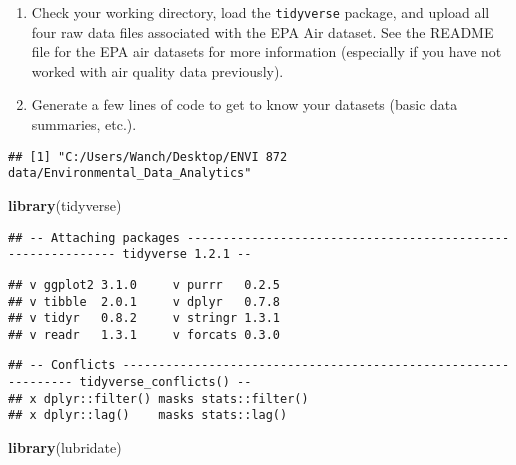 \documentclass[]{article}
\newenvironment{Shaded}{\begin{snugshade}}{\end{snugshade}}
\newcommand{\KeywordTok}[1]{\textcolor[rgb]{0.13,0.29,0.53}{\textbf{#1}}}
\newcommand{\CommentTok}[1]{\textcolor[rgb]{0.56,0.35,0.01}{\textit{#1}}}
\newcommand{\NormalTok}[1]{#1}
\begin{document}
\begin{enumerate}
\def\labelenumi{\arabic{enumi}.}
\item
  Check your working directory, load the \texttt{tidyverse} package, and
  upload all four raw data files associated with the EPA Air dataset.
  See the README file for the EPA air datasets for more information
  (especially if you have not worked with air quality data previously).
\item
  Generate a few lines of code to get to know your datasets (basic data
  summaries, etc.).
\end{enumerate}

\begin{Shaded}
\end{Shaded}

\begin{verbatim}
## [1] "C:/Users/Wanch/Desktop/ENVI 872 data/Environmental_Data_Analytics"
\end{verbatim}

\begin{Shaded}
\begin{Highlighting}[]
\KeywordTok{library}\NormalTok{(tidyverse)}
\end{Highlighting}
\end{Shaded}

\begin{verbatim}
## -- Attaching packages ------------------------------------------------------------ tidyverse 1.2.1 --
\end{verbatim}

\begin{verbatim}
## v ggplot2 3.1.0     v purrr   0.2.5
## v tibble  2.0.1     v dplyr   0.7.8
## v tidyr   0.8.2     v stringr 1.3.1
## v readr   1.3.1     v forcats 0.3.0
\end{verbatim}

\begin{verbatim}
## -- Conflicts --------------------------------------------------------------- tidyverse_conflicts() --
## x dplyr::filter() masks stats::filter()
## x dplyr::lag()    masks stats::lag()
\end{verbatim}

\begin{Shaded}
\begin{Highlighting}[]
\KeywordTok{library}\NormalTok{(lubridate)}
\end{Highlighting}
\end{Shaded}
\end{document}
